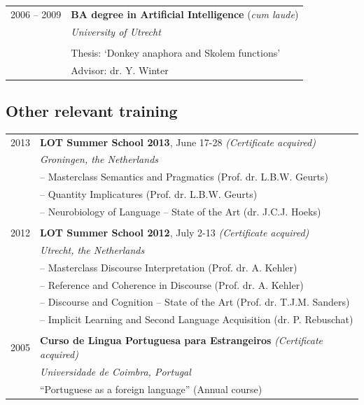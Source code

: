 \documentclass[a4paper,10pt]{article}
\def\leftcolwidth{.15\textwidth}
\def\tablevspace{10pt}
\begin{document}
\vspace{\tablevspace}

\noindent
\begin{tabularx}{\textwidth}{ p{\leftcolwidth} X }
  2006 -- 2009  
  & \textbf{BA degree in Artificial Intelligence} (\textit{cum laude})\\
  & \textit{University of Utrecht}\\
  & \\
  & Thesis: `Donkey anaphora and Skolem functions'\\
  & Advisor: dr. Y. Winter\\
\end{tabularx}

\vspace{\tablevspace}


\subsection*{Other relevant training}

\noindent
\begin{tabularx}{\textwidth}{ p{\leftcolwidth} X }
  2013 & \textbf{LOT Summer School 2013}, June 17-28 \textit{(Certificate acquired)}\\
       & \textit{Groningen, the Netherlands}\\
       & -- {Masterclass Semantics and Pragmatics} (Prof. dr. L.B.W. Geurts)\\
       & -- {Quantity Implicatures} (Prof. dr. L.B.W. Geurts)\\
       & -- {Neurobiology of Language -- State of the Art} (dr. J.C.J. Hoeks)\\
       & \\
  2012 & \textbf{LOT Summer School 2012}, July 2-13 \textit{(Certificate acquired)}\\
       & \textit{Utrecht, the Netherlands}\\
       & -- {Masterclass Discourse Interpretation} (Prof. dr. A. Kehler)\\
       & -- {Reference and Coherence in Discourse} (Prof. dr. A. Kehler)\\
       & -- {Discourse and Cognition -- State of the Art} (Prof. dr. T.J.M. Sanders)\\
       & -- {Implicit Learning and Second Language Acquisition}
         (dr. P. Rebuschat)\\
       & \\
  2005 & \textbf{Curso de Lingua Portuguesa para Estrangeiros} 
         \textit{(Certificate acquired)}\\
       & \textit{Universidade de Coimbra, Portugal}\\
       & ``Portuguese as a foreign language'' (Annual course)\\

\end{tabularx}
\end{document}
